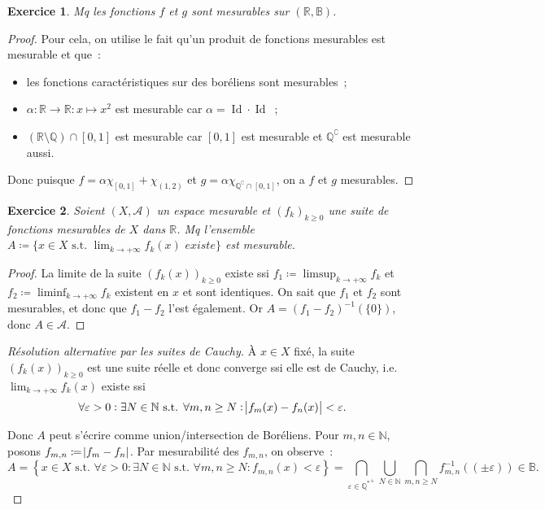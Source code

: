 \documentclass{article}
\newtheorem{ex}{Exercice}[section]
\theoremstyle{definition}
\newcommand{\pinfty}{{+\infty}}
\newcommand{\st}{\text{ s.t. }}
\newcommand{\C}{\complement}
\newcommand{\N}{{\mathbb N}}
\newcommand{\Q}{{\mathbb Q}}
\newcommand{\R}{{\mathbb R}}
\newcommand{\B}{{\mathbb B}}
\DeclareMathOperator{\Id}{Id}
\begin{document}
\begin{ex} Mq les fonctions $f$ et $g$ sont mesurables sur $(\R, \B)$.
\end{ex}

\begin{proof} Pour cela, on utilise le fait qu'un produit de fonctions mesurables est mesurable et que~:
\begin{itemize}
	\item les fonctions caractéristiques sur des boréliens sont mesurables~;
	\item $\alpha : \R \to \R : x \mapsto x^2$ est mesurable car $\alpha = \Id \cdot \Id$~;
	\item $(\R \setminus \Q) \cap [0, 1]$ est mesurable car $[0, 1]$ est mesurable et $\Q^\C$ est mesurable aussi.
\end{itemize}

Donc puisque $f = \alpha\chi_{[0, 1]} + \chi_{(1, 2)}$ et $g = \alpha\chi_{\Q^\C \cap [0, 1]}$, on a $f$ et $g$ mesurables.
\end{proof}

\begin{ex} Soient $(X, \mathcal A)$ un espace mesurable et $(f_k)_{k \geq 0}$ une suite de fonctions mesurables de $X$ dans $\R$. Mq
l'ensemble $A \coloneqq \{x \in X \st \lim_{k \to \pinfty}f_k(x) \textit{ existe}\}$ est mesurable.
\end{ex}

\begin{proof} La limite de la suite $(f_k(x))_{k \geq 0}$ existe ssi $f_1 \coloneqq \limsup_{k \to \pinfty}f_k$ et $f_2 \coloneqq \liminf_{k \to \pinfty}f_k$ existent en $x$
et sont identiques. On sait que $f_1$ et $f_2$ sont mesurables, et donc que $f_1 - f_2$ l'est également. Or $A = (f_1-f_2)^{-1}(\{0\})$, donc $A \in \mathcal A$.
\end{proof}

\begin{proof}[Résolution alternative par les suites de Cauchy] À $x \in X$ fixé, la suite $(f_k(x))_{k \geq 0}$ est une suite réelle et donc converge ssi elle est de Cauchy,
i.e. $\lim_{k \to \pinfty}f_k(x)$ existe ssi
\[\forall \varepsilon > 0 : \exists N \in \N \st \forall m, n \geq N : \abs {f_m(x) - f_n(x)} < \varepsilon.\]

Donc $A$ peut s'écrire comme union/intersection de Boréliens. Pour $m, n \in \N$, posons $f_{m,n} \coloneqq \abs {f_m-f_n}$. Par mesurabilité des $f_{m,n}$, on observe~:
\[A = \left\{x \in X \st \forall \varepsilon > 0 : \exists N \in \N \st \forall m, n \geq N : f_{m,n}(x) < \varepsilon\right\}
	= \bigcap_{\varepsilon \in {\Q^*}^+}\bigcup_{N \in \N}\bigcap_{m,n \geq N}f_{m,n}^{-1}((\pm \varepsilon)) \in \B.\]
\end{proof}
\end{document}
